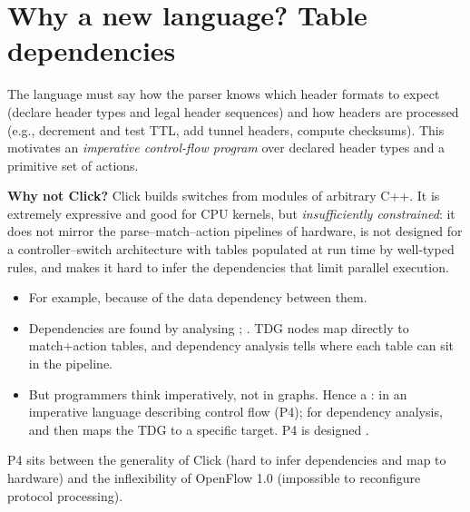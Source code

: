 \section{Why a new language? Table dependencies}
The language must say how the parser knows which header formats to expect (declare header types and legal header sequences) and how headers are processed (e.g., decrement and test TTL, add tunnel headers, compute checksums). This motivates an \emph{imperative control-flow program} over declared header types and a primitive set of actions.

\textbf{Why not Click?} Click builds switches from modules of arbitrary C++. It is extremely expressive and good for CPU kernels, but \emph{insufficiently constrained}: it does not mirror the parse--match--action pipelines of hardware, is not designed for a controller--switch architecture with tables populated at run time by well-typed rules, and makes it hard to infer the dependencies that limit parallel execution.

\begin{itemize}
\item {}  For example,  because of the data dependency between them.
\item Dependencies are found by analysing ; . TDG nodes map directly to match+action tables, and dependency analysis tells where each table can sit in the pipeline.
\item But programmers think imperatively, not in graphs. Hence a :  in an imperative language describing control flow (P4);  for dependency analysis, and then maps the TDG to a specific target. P4 is designed .
\end{itemize}
\begin{keybox}
P4 sits between the generality of Click (hard to infer dependencies and map to hardware) and the inflexibility of OpenFlow 1.0 (impossible to reconfigure protocol processing).
\end{keybox}

